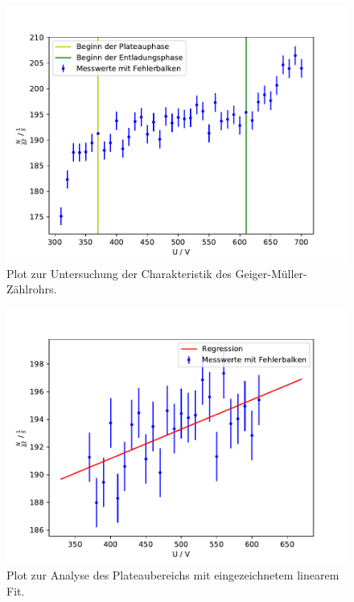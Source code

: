 \begin{figure}
  \centering
  \includegraphics[scale=0.5]{1.pdf}
  \caption{Plot zur Untersuchung der Charakteristik des Geiger-Müller-Zählrohrs.}
  \label{abb1}
\end{figure}
\FloatBarrier
\begin{figure}
  \centering
  \includegraphics[scale=0.5]{1b.pdf}
  \caption{Plot zur Analyse des Plateaubereichs mit eingezeichnetem linearem Fit.}
  \label{abb2}
\end{figure}
\FloatBarrier

